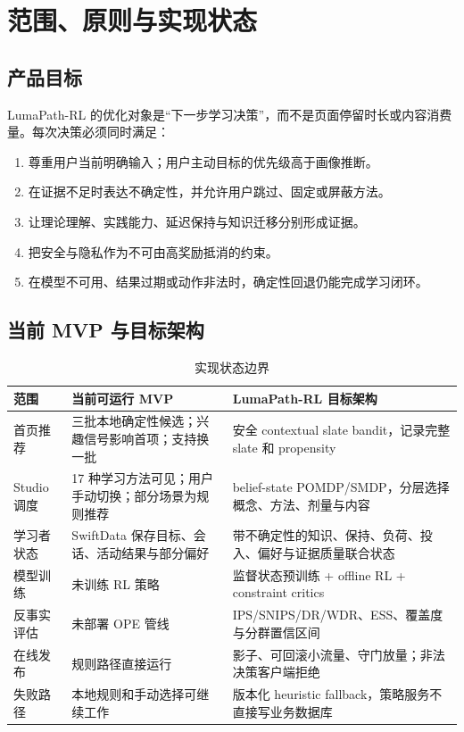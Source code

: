 \documentclass[11pt,a4paper,fontset=none]{ctexart}
\newcommand{\1}{\mathbb{I}}
\begin{document}
\tableofcontents
\clearpage
{}

\section{范围、原则与实现状态}

\subsection{产品目标}

LumaPath-RL 的优化对象是“下一步学习决策”，而不是页面停留时长或内容消费量。每次决策必须同时满足：
\begin{enumerate}
  \item 尊重用户当前明确输入；用户主动目标的优先级高于画像推断。
  \item 在证据不足时表达不确定性，并允许用户跳过、固定或屏蔽方法。
  \item 让理论理解、实践能力、延迟保持与知识迁移分别形成证据。
  \item 把安全与隐私作为不可由高奖励抵消的约束。
  \item 在模型不可用、结果过期或动作非法时，确定性回退仍能完成学习闭环。
\end{enumerate}

\subsection{当前 MVP 与目标架构}

\begin{table}[htbp]
  \centering
  \caption{实现状态边界}
  \label{tab:status}
  \begin{tabularx}{\textwidth}{L{29mm}YY}
    \toprule
    范围 & 当前可运行 MVP & LumaPath-RL 目标架构 \\
    \midrule
    首页推荐 & 三批本地确定性候选；兴趣信号影响首项；支持换一批 & 安全 contextual slate bandit，记录完整 slate 和 propensity \\
    Studio 调度 & 17 种学习方法可见；用户手动切换；部分场景为规则推荐 & belief-state POMDP/SMDP，分层选择概念、方法、剂量与内容 \\
    学习者状态 & SwiftData 保存目标、会话、活动结果与部分偏好 & 带不确定性的知识、保持、负荷、投入、偏好与证据质量联合状态 \\
    模型训练 & 未训练 RL 策略 & 监督状态预训练 + offline RL + constraint critics \\
    反事实评估 & 未部署 OPE 管线 & IPS/SNIPS/DR/WDR、ESS、覆盖度与分群置信区间 \\
    在线发布 & 规则路径直接运行 & 影子、可回滚小流量、守门放量；非法决策客户端拒绝 \\
    失败路径 & 本地规则和手动选择可继续工作 & 版本化 heuristic fallback，策略服务不直接写业务数据库 \\
    \bottomrule
  \end{tabularx}
\end{table}
\end{document}
